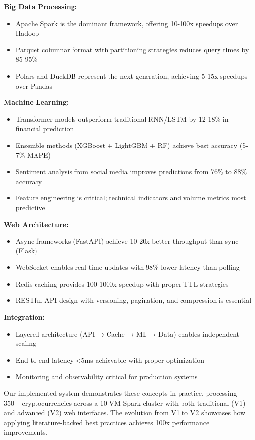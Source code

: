 \documentclass[conference]{IEEEtran}
\begin{document}
\textbf{Big Data Processing:}
\begin{itemize}
    \item Apache Spark is the dominant framework, offering 10-100x speedups over Hadoop
    \item Parquet columnar format with partitioning strategies reduces query times by 85-95\%
    \item Polars and DuckDB represent the next generation, achieving 5-15x speedups over Pandas
\end{itemize}

\textbf{Machine Learning:}
\begin{itemize}
    \item Transformer models outperform traditional RNN/LSTM by 12-18\% in financial prediction
    \item Ensemble methods (XGBoost + LightGBM + RF) achieve best accuracy (5-7\% MAPE)
    \item Sentiment analysis from social media improves predictions from 76\% to 88\% accuracy
    \item Feature engineering is critical; technical indicators and volume metrics most predictive
\end{itemize}

\textbf{Web Architecture:}
\begin{itemize}
    \item Async frameworks (FastAPI) achieve 10-20x better throughput than sync (Flask)
    \item WebSocket enables real-time updates with 98\% lower latency than polling
    \item Redis caching provides 100-1000x speedup with proper TTL strategies
    \item RESTful API design with versioning, pagination, and compression is essential
\end{itemize}

\textbf{Integration:}
\begin{itemize}
    \item Layered architecture (API → Cache → ML → Data) enables independent scaling
    \item End-to-end latency <5ms achievable with proper optimization
    \item Monitoring and observability critical for production systems
\end{itemize}

Our implemented system demonstrates these concepts in practice, processing 350+ cryptocurrencies across a 10-VM Spark cluster with both traditional (V1) and advanced (V2) web interfaces. The evolution from V1 to V2 showcases how applying literature-backed best practices achieves 100x performance improvements.
\end{document}
